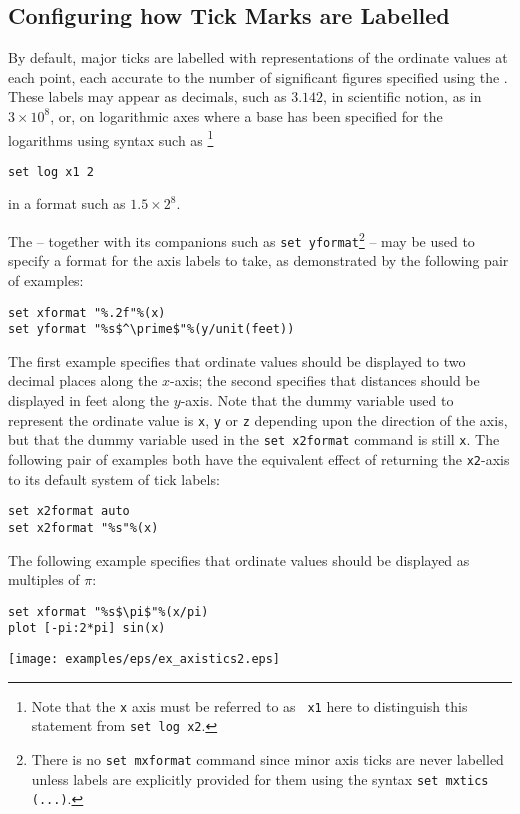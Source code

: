 \subsection{Configuring how Tick Marks are Labelled}

By default, major ticks are labelled with representations of the ordinate
values at each point, each accurate to the number of significant figures
specified using the . These labels may appear as
decimals, such as $3.142$, in scientific notion, as in $3\times10^8$, or, on
logarithmic axes where a base has been specified for the logarithms using
syntax such as \footnote{Note that the {\tt x} axis must be referred to as {\tt
x1} here to distinguish this statement from {\tt set log x2}.}
\begin{verbatim}
set log x1 2
\end{verbatim}
in a format such as $1.5\times2^8$.

The  -- together with its companions such as {\tt set
yformat}\footnote{There is no {\tt set mxformat} command since minor axis ticks
are never labelled unless labels are explicitly provided for them using the
syntax {\tt set mxtics (...)}.} -- may be used to specify a format for the axis
labels to take, as demonstrated by the following pair of examples:
\begin{verbatim}
set xformat "%.2f"%(x)
set yformat "%s$^\prime$"%(y/unit(feet))
\end{verbatim}
The first example specifies that ordinate values should be displayed to two
decimal places along the $x$-axis; the second specifies that distances should
be displayed in feet along the $y$-axis. Note that the dummy variable used to
represent the ordinate value is {\tt x}, {\tt y} or {\tt z} depending upon the
direction of the axis, but that the dummy variable used in the {\tt set
x2format} command is still {\tt x}. The following pair of examples both have
the equivalent effect of returning the {\tt x2}-axis to its default system of
tick labels:
\begin{verbatim}
set x2format auto
set x2format "%s"%(x)
\end{verbatim}

The following example specifies that ordinate values should be displayed as
multiples of $\pi$:
\begin{verbatim}
set xformat "%s$\pi$"%(x/pi)
plot [-pi:2*pi] sin(x)
\end{verbatim}

\noindent\centerline{\texttt{[image: examples/eps/ex\_axistics2.eps]}}

